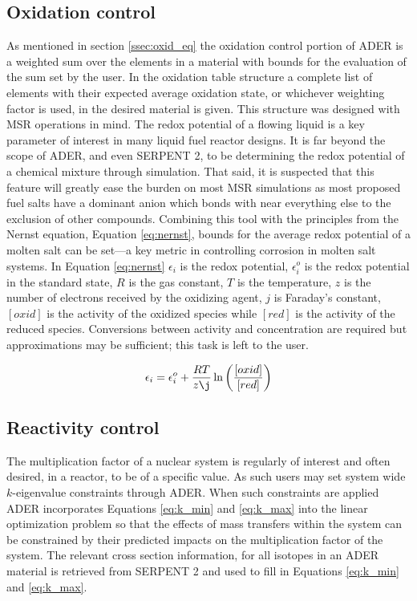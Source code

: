 \subsection{Oxidation control} \label{ssec:oxi}
As mentioned in section \ref{ssec:oxid_eq} the oxidation control portion of 
ADER is a weighted sum over
the elements in a material with bounds for the evaluation of the sum set by 
the user. In the oxidation table structure a complete list
of elements with their expected average oxidation state, or whichever weighting
factor is used, in the desired material is given. This structure was designed 
with MSR operations in mind. The redox potential of a flowing liquid
is a key parameter of interest in many liquid fuel reactor designs. It is far 
beyond the scope of ADER, and even SERPENT 2, to be determining the redox 
potential of a chemical mixture through simulation. 
That said, it is suspected that this feature will greatly ease the
burden on most MSR simulations as most proposed fuel salts have a dominant
anion which bonds with near everything else to the exclusion of other
compounds. Combining this tool with the principles from the Nernst equation,
Equation \ref{eq:nernst}, bounds for the average redox potential of a molten
salt can be set---a key metric in controlling corrosion in molten salt systems.
In Equation \ref{eq:nernst} $\epsilon_{i}$ is the redox potential,
$\epsilon_{i}^{o}$ is the redox potential in the standard state, $R$ is the gas
constant, $T$ is the temperature, $z$ is the number of electrons received by the
oxidizing agent, $j$ is Faraday's constant, $[oxid]$ is the activity of the 
oxidized species while $[red]$ is the activity of the reduced species.
Conversions between activity and concentration are required but approximations 
may be sufficient; this task is left to the user.

\begin{equation}
\label{eq:nernst}
    \epsilon_{i} = \epsilon_{i}^{o} + \frac{RT}{z \j}\ln\left(\frac{[oxid]}{[red]}\right)
\end{equation}


\subsection{Reactivity control} \label{ssec:reactivity}
The multiplication factor of a nuclear system is regularly of interest
and often desired, in a reactor, to be of a specific value.
As such users may set system wide $k$-eigenvalue
constraints through ADER. When such constraints are applied ADER
incorporates Equations \ref{eq:k_min} and \ref{eq:k_max} into
the linear optimization problem so that the effects of mass transfers
within the system can be constrained by their predicted impacts on
the multiplication factor of the system. The relevant cross section information,
for all isotopes in an ADER material is retrieved from SERPENT 2 and used to 
fill in Equations \ref{eq:k_min} and \ref{eq:k_max}. 


